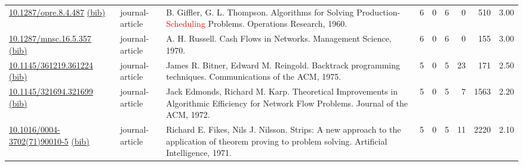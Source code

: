 {\begin{longtable}{p{5cm}lp{11cm}rrrrrr}
\href{http://dx.doi.org/10.1287/opre.8.4.487}{10.1287/opre.8.4.487} \href{https://www.doi2bib.org/bib/10.1287/opre.8.4.487}{(bib)} & journal-article & B. Giffler, G. L. Thompson. Algorithms for Solving Production-\textcolor{red}{Scheduling} Problems. Operations Research, 1960. & 6 & 0 & 6 & 0 & 510 &  3.00\\
\href{http://dx.doi.org/10.1287/mnsc.16.5.357}{10.1287/mnsc.16.5.357} \href{https://www.doi2bib.org/bib/10.1287/mnsc.16.5.357}{(bib)} & journal-article & A. H. Russell. Cash Flows in Networks. Management Science, 1970. & 6 & 0 & 6 & 0 & 155 &  3.00\\
\href{http://dx.doi.org/10.1145/361219.361224}{10.1145/361219.361224} \href{https://www.doi2bib.org/bib/10.1145/361219.361224}{(bib)} & journal-article & James R. Bitner, Edward M. Reingold. Backtrack programming techniques. Communications of the ACM, 1975. & 5 & 0 & 5 & 23 & 171 &  2.50\\
\href{http://dx.doi.org/10.1145/321694.321699}{10.1145/321694.321699} \href{https://www.doi2bib.org/bib/10.1145/321694.321699}{(bib)} & journal-article & Jack Edmonds, Richard M. Karp. Theoretical Improvements in Algorithmic Efficiency for Network Flow Problems. Journal of the ACM, 1972. & 5 & 0 & 5 & 7 & 1563 &  2.20\\
\href{http://dx.doi.org/10.1016/0004-3702(71)90010-5}{10.1016/0004-3702(71)90010-5} \href{https://www.doi2bib.org/bib/10.1016/0004-3702(71)90010-5}{(bib)} & journal-article & Richard E. Fikes, Nils J. Nilsson. Strips: A new approach to the application of theorem proving to problem solving. Artificial Intelligence, 1971. & 5 & 0 & 5 & 11 & 2220 &  2.10\\
\end{longtable}
}

